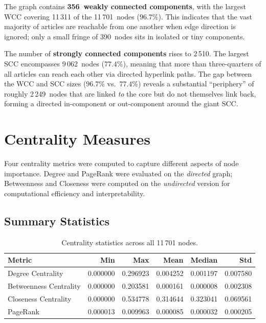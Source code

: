 \documentclass[12pt,a4paper]{article}
\begin{document}
The graph contains \textbf{356~weakly connected components}, with the largest
WCC covering 11\,311 of the 11\,701~nodes ($96.7\%$).  This indicates that the
vast majority of articles are reachable from one another when edge direction is
ignored; only a small fringe of 390~nodes sits in isolated or tiny components.

The number of \textbf{strongly connected components} rises to 2\,510.  The
largest SCC encompasses 9\,062~nodes ($77.4\%$), meaning that more than
three-quarters of all articles can reach each other via directed hyperlink
paths.  The gap between the WCC and SCC sizes ($96.7\%$ vs.\ $77.4\%$)
reveals a substantial ``periphery'' of roughly 2\,249~nodes that are linked
\emph{to} the core but do not themselves link back, forming a directed
in-component or out-component around the giant SCC.

\section{Centrality Measures}

Four centrality metrics were computed to capture different aspects of node
importance.  Degree and PageRank were evaluated on the \emph{directed} graph;
Betweenness and Closeness were computed on the \emph{undirected} version for
computational efficiency and interpretability.

\subsection{Summary Statistics}

\begin{table}[H]
\centering
\caption{Centrality statistics across all 11\,701 nodes.}
\label{tab:centrality}
\begin{tabular}{lrrrrr}
\toprule
\textbf{Metric} & \textbf{Min} & \textbf{Max} & \textbf{Mean} & \textbf{Median} & \textbf{Std} \\
\midrule
Degree Centrality      & 0.000000 & 0.296923 & 0.004252 & 0.001197 & 0.007580 \\
Betweenness Centrality & 0.000000 & 0.203581 & 0.000161 & 0.000008 & 0.002308 \\
Closeness Centrality   & 0.000000 & 0.534778 & 0.314644 & 0.323041 & 0.069561 \\
PageRank               & 0.000013 & 0.009963 & 0.000085 & 0.000032 & 0.000205 \\
\bottomrule
\end{tabular}
\end{table}
\end{document}
